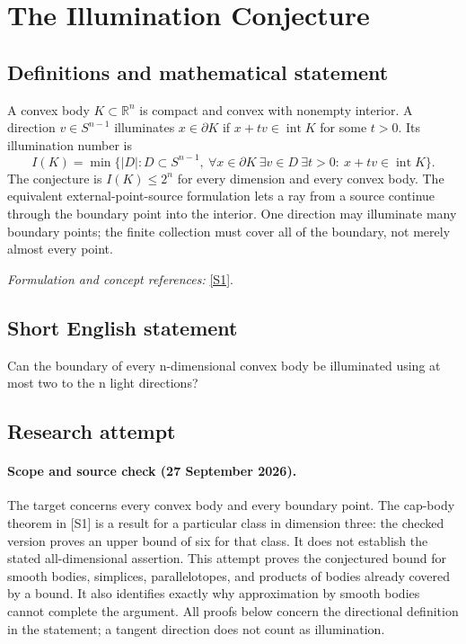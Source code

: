 \documentclass[11pt]{article}
\begin{document}
\section*{\texorpdfstring{The Illumination Conjecture}{The Illumination Conjecture}}\label{1123}
\subsection{Definitions and mathematical statement}
A convex body $K\subset{\mathbb{R}}^n$ is compact and convex with nonempty interior. A direction $v\in S^{n-1}$ illuminates $x\in\partial K$ if $x+tv\in\operatorname{int}K$ for some $t>0$. Its illumination number is
\[
 I(K)=\min\{|D|:D\subset S^{n-1},\
 \forall x\in\partial K\ \exists v\in D\ \exists t>0:\
 x+tv\in\operatorname{int}K\}.
\]
The conjecture is $I(K)\le2^n$ for every dimension and every convex body. The equivalent external-point-source formulation lets a ray from a source continue through the boundary point into the interior. One direction may illuminate many boundary points; the finite collection must cover all of the boundary, not merely almost every point.
\par\smallskip\textit{Formulation and concept references:} \href{https://arxiv.org/pdf/2507.08712}{[S1]}.

\subsection{Short English statement}
Can the boundary of every n-dimensional convex body be illuminated using at most two to the n light directions?
\subsection{Research attempt}
\paragraph{Scope and source check (27 September 2026).}
The target concerns every convex body and every boundary point. The cap-body theorem in [S1] is a result for a particular class in dimension three: the checked version proves an upper bound of six for that class. It does not establish the stated all-dimensional assertion. This attempt proves the conjectured bound for smooth bodies, simplices, parallelotopes, and products of bodies already covered by a bound. It also identifies exactly why approximation by smooth bodies cannot complete the argument. All proofs below concern the directional definition in the statement; a tangent direction does not count as illumination.
\end{document}
